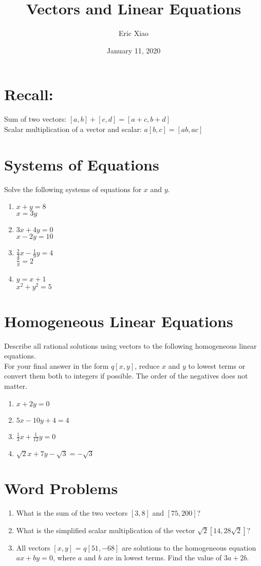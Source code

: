 \documentclass[11pt]{extarticle}
\title{\textbf{Vectors and Linear Equations}}
\author{Eric Xiao}
\date{January 11, 2020}
\begin{document}
\maketitle

\section{Recall:}
Sum of two vectors: $[a,b] + [c,d] = [a+c, b+d]$\\
Scalar multiplication of a vector and scalar: $a[b,c] = [ab, ac]$

\section{Systems of Equations}
Solve the following systems of equations for $x$ and $y$.
\begin{enumerate}
    \itemsep5.0em
    \item $x + y = 8$ \\ $x = 3y$
    \item $3x + 4y = 0$ \\ $x - 2y = 10$
    \item $\frac{2}{3}x - \frac{1}{9}y = 4$ \\ $\frac{x}{y} = 2$
    \item $y = x + 1$ \\ $x^2 + y^2 = 5$
\end{enumerate}

\section{Homogeneous Linear Equations}
Describe all rational solutions using vectors to the following homogeneous linear equations.\\
For your final answer in the form $q[x, y]$, reduce $x$ and $y$ to lowest terms or convert them both to integers if possible. The order of the negatives does not matter.
\begin{enumerate}
    \itemsep2.5em
    \item $x + 2y = 0$
    \item $5x - 10y + 4 = 4$
    \item $\frac{1}{3}x + \frac{1}{12}y = 0$
    \item $\sqrt{2}x + 7y - \sqrt{3} = -\sqrt{3}$
\end{enumerate}

\section{Word Problems}
\begin{enumerate}
    \itemsep2.5em
    \item What is the sum of the two vectors $[3, 8]$ and $[75, 200]$?
    \item What is the simplified scalar multiplication of the vector $\sqrt{2}[14, 28\sqrt{2}]$?
    \item All vectors $[x,y]$ = $q[51, -68]$ are solutions to the homogeneous equation $ax + by = 0$, where $a$ and $b$ are in lowest terms. Find the value of $3a + 2b$.
\end{enumerate}
\end{document}
